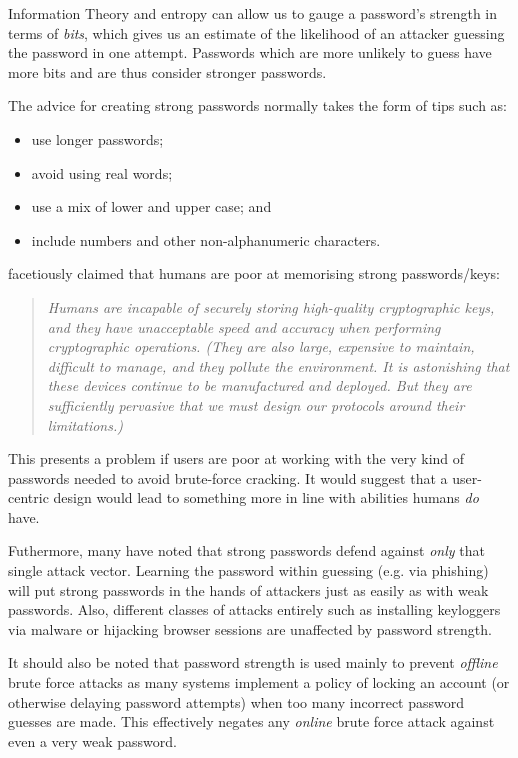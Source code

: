 \documentclass{report}
\begin{document}
Information Theory and entropy can allow us to gauge a password's strength
in terms of \emph{bits}, which gives us an estimate of the likelihood of
an attacker guessing the password in one attempt. Passwords which are
more unlikely to guess have more bits and are thus consider stronger passwords.

The advice for creating strong passwords normally takes the form of tips
such as:

\begin{itemize}
  \item use longer passwords;
  \item avoid using real words;
  \item use a mix of lower and upper case; and
  \item include numbers and other non-alphanumeric characters.
\end{itemize}

\cite{kaufman2002network} facetiously claimed that humans are poor
at memorising strong passwords/keys:

\begin{quotation}
  \emph{
  Humans are incapable of securely storing high-quality
  cryptographic keys, and they have unacceptable speed and
  accuracy when performing cryptographic operations. (They are
  also large, expensive to maintain, difficult to manage, and they
  pollute the environment. It is astonishing that these devices
  continue to be manufactured and deployed. But they are
  sufficiently pervasive that we must design our protocols around
  their limitations.)
  }
\end{quotation}

This presents a problem if users are poor at working with the
very kind of passwords needed to avoid brute-force cracking. It
would suggest that a user-centric design would lead to something
more in line with abilities humans \emph{do} have.

Futhermore, many have noted that strong passwords defend
against \emph{only} that single attack vector. Learning the
password within guessing (e.g. via phishing) will put strong
passwords in the hands of attackers just as easily as with
weak passwords. Also, different classes of attacks entirely
such as installing keyloggers via malware or hijacking browser
sessions are unaffected by password strength.

It should also be noted that password strength is
used mainly to prevent
\emph{offline} brute force attacks as many systems
implement a policy of locking an account (or otherwise
delaying password attempts) when too many incorrect
password guesses are made. This effectively negates any
\emph{online} brute force attack against even a very weak
password.
\end{document}
